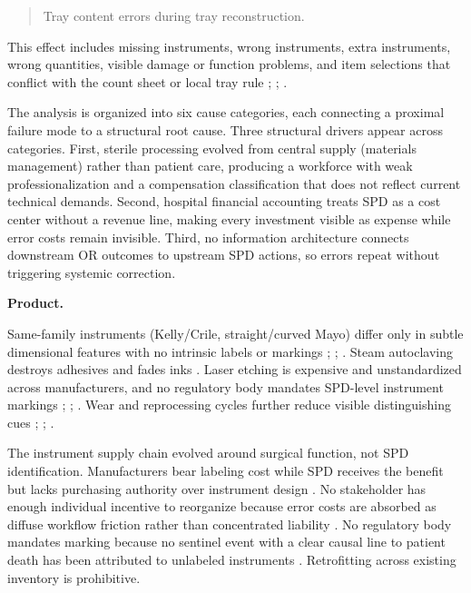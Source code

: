 \documentclass[10pt,a4paper]{article}
\begin{document}
\begin{quote}
Tray content errors during tray reconstruction.
\end{quote}

This effect includes missing instruments, wrong instruments, extra instruments,
wrong quantities, visible damage or function problems, and item selections that
conflict with the count sheet or local tray rule
\cite{alfred-et-al-2021};
\cite{nichol-et-al-2024};
\cite{zhu-et-al-2019}.

The analysis is organized into six cause categories, each connecting a proximal
failure mode to a structural root cause. Three structural drivers appear across
categories. First, sterile processing evolved from central supply (materials
management) rather than patient care, producing a workforce with weak
professionalization and a compensation classification that does not reflect
current technical demands. Second, hospital financial accounting treats SPD as a
cost center without a revenue line, making every investment visible as expense
while error costs remain invisible. Third, no information architecture connects
downstream OR outcomes to upstream SPD actions, so errors repeat without
triggering systemic correction.

\textbf{Product.}

Same-family instruments (Kelly/Crile, straight/curved Mayo) differ only in
subtle dimensional features with no intrinsic labels or markings
\cite{alfred-et-al-2021};
\cite{lind-2026a};
\cite{nichol-et-al-2024}. Steam autoclaving
destroys adhesives and fades inks
\cite{infection-control-today-instrument-marking-2017}. Laser etching is
expensive and unstandardized across manufacturers, and no regulatory body
mandates SPD-level instrument markings
\cite{alfred-et-al-2021};
\cite{hspa-instrument-resources-accessed-2026};
\cite{nichol-and-saari-2023}. Wear and
reprocessing cycles further reduce visible distinguishing cues
\cite{alfred-et-al-2021};
\cite{lind-2026a};
\cite{nichol-et-al-2024}.

The instrument supply chain evolved around surgical function, not SPD
identification. Manufacturers bear labeling cost while SPD receives the benefit
but lacks purchasing authority over instrument design
\cite{ashcsp-central-service-history}. No stakeholder has enough individual
incentive to reorganize because error costs are absorbed as diffuse workflow
friction rather than concentrated liability
\cite{association-of-health-care-journalists-2024}. No regulatory body mandates
marking because no sentinel event with a clear causal line to patient death has
been attributed to unlabeled instruments
\cite{joint-commission-sentinel-event-2024}. Retrofitting across existing
inventory is prohibitive.
\end{document}
